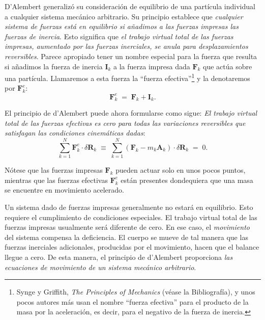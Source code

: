 \documentclass[12pt,a4paper]{book}
\begin{document}
D'Alembert generalizó su consideración de equilibrio de una partícula individual a cualquier sistema mecánico arbitrario. Su principio establece que \textit{cualquier sistema de fuerzas está en equilibrio si añadimos a las fuerzas impresas las fuerzas de inercia}. Esto significa que \textit{el trabajo virtual total de las fuerzas impresas, aumentado por las fuerzas inerciales, se anula para desplazamientos reversibles}. Parece apropiado tener un nombre especial para la fuerza que resulta si añadimos la fuerza de inercia $\mathbf{I}_k$ a la fuerza impresa dada $\mathbf{F}_k$ que actúa sobre una partícula. Llamaremos a esta fuerza la ``fuerza efectiva''\footnote{Synge y Griffith, \textit{The Principles of Mechanics} (véase la Bibliografía), y unos pocos autores más usan el nombre ``fuerza efectiva'' para el producto de la masa por la aceleración, es decir, para el negativo de la fuerza de inercia.} y la denotaremos por $\mathbf{F}_k^e$:
\begin{equation}
\mathbf{F}_k^e \;=\; \mathbf{F}_k + \mathbf{I}_k. \tag{41.5}
\end{equation}

El principio de d'Alembert puede ahora formularse como sigue: \textit{El trabajo virtual total de las fuerzas efectivas es cero para todas las variaciones reversibles que satisfagan las condiciones cinemáticas dadas}:
\begin{equation}
\sum_{k=1}^{N} \mathbf{F}_k^e \cdot \delta\mathbf{R}_k \;\equiv\; \sum_{k=1}^{N} (\mathbf{F}_k - m_k \mathbf{A}_k) \cdot \delta\mathbf{R}_k \;=\; 0. \tag{41.6}
\end{equation}

Nótese que las fuerzas impresas $\mathbf{F}_k$ pueden actuar solo en unos pocos puntos, mientras que las fuerzas efectivas $\mathbf{F}_k^e$ están presentes dondequiera que una masa se encuentre en movimiento acelerado.

Un sistema dado de fuerzas impresas generalmente no estará en equilibrio. Esto requiere el cumplimiento de condiciones especiales. El trabajo virtual total de las fuerzas impresas usualmente será diferente de cero. En ese caso, el \textit{movimiento} del sistema compensa la deficiencia. El cuerpo se mueve de tal manera que las fuerzas inerciales adicionales, producidas por el movimiento, hacen que el balance llegue a cero. De esta manera, el principio de d'Alembert proporciona \textit{las ecuaciones de movimiento de un sistema mecánico arbitrario}.
\end{document}
